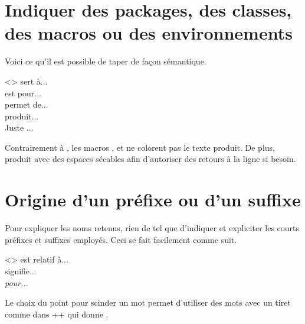 \documentclass{tutodoc}
\begin{document}
\section{Indiquer des packages, des classes, des macros ou des environnements}

Voici ce qu'il est possible de taper de façon sémantique.


\begin{tdoclatex}<>
 sert à...      \\
 est pour... \\
 permet de... \\
 produit...          \\
Juste ...
\end{tdoclatex}


\begin{tdocrem}
    Contrairement à , les macros ,  et  ne colorent pas le texte produit.
    De plus,  produit  avec des espaces sécables afin d'autoriser des retours à la ligne si besoin.
\end{tdocrem}



\section{Origine d'un préfixe ou d'un suffixe}

Pour expliquer les noms retenus, rien de tel que d'indiquer et expliciter les courts préfixes et suffixes employés. Ceci se fait facilement comme suit.


\begin{tdoclatex}<>
 est relatif à...     \\
 signifie...  \\
\emph{ pour...}
\end{tdoclatex}


\begin{tdocrem}
    Le choix du point pour scinder un mot permet d'utiliser des mots avec un tiret comme dans \tdoclatexin++ qui donne .
\end{tdocrem}
\end{document}
